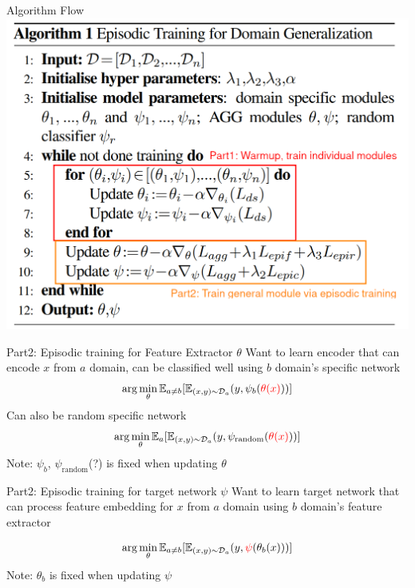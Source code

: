 \documentclass{beamer}
\begin{document}
\begin{frame}{Algorithm Flow}
  \includegraphics[width=.7\textwidth]{fig/epi-alg-flow.png}
\end{frame}

\begin{frame}{Part2: Episodic training for Feature Extractor $\theta$}
    Want to learn encoder that can encode $x$ from $a$ domain, can be classified well using $b$ domain's specific network
    \begin{equation*}
      \arg \min_\theta \mathbb{E}_{ a \neq b} [\mathbb{E}_{(x,y) \sim \mathcal{D}_a}(y, \psi_b({\color{red}{\theta(x)}}))] 
    \end{equation*}
    \vspace{1em}
    Can also be random specific network
    \begin{equation*}
      \arg \min_\theta \mathbb{E}_{a} [\mathbb{E}_{(x,y) \sim \mathcal{D}_a}(y, \psi_{\text{random}}({\color{red}{\theta(x)}}))] 
    \end{equation*}
    \vspace{1em}
    Note: $\psi_b$, $\psi_{\text{random}}$(?) is fixed when updating $\theta$
\end{frame}

\begin{frame}[t]{Part2: Episodic training for target network $\psi$}
  Want to learn target network that can process feature embedding for $x$ from $a$ domain using $b$ domain's feature extractor

  \begin{equation*}
    \arg \min_\theta \mathbb{E}_{ a \neq b} [\mathbb{E}_{(x,y) \sim \mathcal{D}_a}(y, {\color{red}{\psi}}(\theta_b(x)))] 
  \end{equation*}
    Note: $\theta_b$ is fixed when updating $\psi$
\end{frame}
\end{document}
